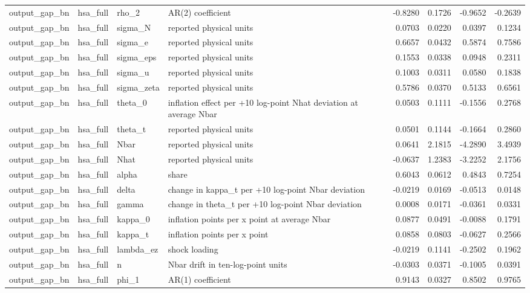 \begin{tabular}{llllrrrr}
output\_gap\_bn & hsa\_full & rho\_2 & AR(2) coefficient & -0.8280 & 0.1726 & -0.9652 & -0.2639 \\
output\_gap\_bn & hsa\_full & sigma\_N & reported physical units & 0.0703 & 0.0220 & 0.0397 & 0.1234 \\
output\_gap\_bn & hsa\_full & sigma\_e & reported physical units & 0.6657 & 0.0432 & 0.5874 & 0.7586 \\
output\_gap\_bn & hsa\_full & sigma\_eps & reported physical units & 0.1553 & 0.0338 & 0.0948 & 0.2311 \\
output\_gap\_bn & hsa\_full & sigma\_u & reported physical units & 0.1003 & 0.0311 & 0.0580 & 0.1838 \\
output\_gap\_bn & hsa\_full & sigma\_zeta & reported physical units & 0.5786 & 0.0370 & 0.5133 & 0.6561 \\
output\_gap\_bn & hsa\_full & theta\_0 & inflation effect per +10 log-point Nhat deviation at average Nbar & 0.0503 & 0.1111 & -0.1556 & 0.2768 \\
output\_gap\_bn & hsa\_full & theta\_t & reported physical units & 0.0501 & 0.1144 & -0.1664 & 0.2860 \\
output\_gap\_bn & hsa\_full & Nbar & reported physical units & 0.0641 & 2.1815 & -4.2890 & 3.4939 \\
output\_gap\_bn & hsa\_full & Nhat & reported physical units & -0.0637 & 1.2383 & -3.2252 & 2.1756 \\
output\_gap\_bn & hsa\_full & alpha & share & 0.6043 & 0.0612 & 0.4843 & 0.7254 \\
output\_gap\_bn & hsa\_full & delta & change in kappa\_t per +10 log-point Nbar deviation & -0.0219 & 0.0169 & -0.0513 & 0.0148 \\
output\_gap\_bn & hsa\_full & gamma & change in theta\_t per +10 log-point Nbar deviation & 0.0008 & 0.0171 & -0.0361 & 0.0331 \\
output\_gap\_bn & hsa\_full & kappa\_0 & inflation points per x point at average Nbar & 0.0877 & 0.0491 & -0.0088 & 0.1791 \\
output\_gap\_bn & hsa\_full & kappa\_t & inflation points per x point & 0.0858 & 0.0803 & -0.0627 & 0.2566 \\
output\_gap\_bn & hsa\_full & lambda\_ez & shock loading & -0.0219 & 0.1141 & -0.2502 & 0.1962 \\
output\_gap\_bn & hsa\_full & n & Nbar drift in ten-log-point units & -0.0303 & 0.0371 & -0.1005 & 0.0391 \\
output\_gap\_bn & hsa\_full & phi\_1 & AR(1) coefficient & 0.9143 & 0.0327 & 0.8502 & 0.9765 \\

\end{tabular}

